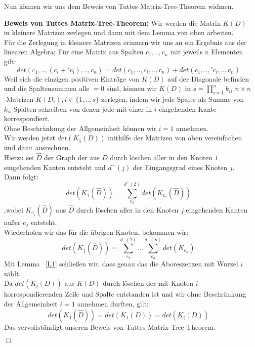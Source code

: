 Nun können wir uns dem Beweis von Tuttes Matrix-Tree-Theorem widmen.

\textbf{Beweis von Tuttes Matrix-Tree-Theorem:}
Wir werden die Matrix $K(D)$ in kleinere Matrizen zerlegen und dann mit dem Lemma von oben arbeiten.\\
Für die Zerlegung in kleinere Matrizen erinnern wir uns an ein Ergebnis aus der linearen Algebra;
Für eine Matrix aus Spalten $c_1,..,c_n$ mit jeweils n Elementen gilt:
\begin{equation}
 det(c_1,..,(c_i+\prime{c_i}),..,c_n) = det(c_1,..,c_i,..,c_n) + det(c_1,..,\prime{c_i},..,c_n)
\end{equation}
Weil sich die einzigen positiven Einträge von $K(D)$ auf der Diagonale befinden und die Spaltensummen alle $=0$ sind, können wir $K(D)$ in  $s=\prod_{i=1}^nk_{ii}$ $n \times n$-Matrizen $K(D_i), i\in\{1,..,s\}$ zerlegen, indem wir jede Spalte als Summe von $k_{ii}$ Spalten schreiben von denen jede mit einer in $i$ eingehenden Kante korrespondiert.\\
Ohne Beschränkung der Allgemeinheit können wir $i=1$ annehmen.\\
Wir werden jetzt $det(K_{\bar{1}}(D))$ mithilfe der Matrizen von oben vereinfachen und dann ausrechnen.\\
Hierzu sei $\hat{D}$ der Graph der aus $D$ durch löschen aller in den Knoten $1$ eingehenden Kanten entsteht und $d^{-}(j)$ der Eingangsgrad eines Knoten $j$. Dann folgt:
\begin{equation}
 det(K_{\bar{1}}(\hat{D})) = \sum_{e_2}^{d^{-}(2)}det(K_{e_2}(\hat{D}))
\end{equation}
,wobei $K_{e_j}(\hat{D})$ aus $\hat{D}$ durch löschen aller in den Knoten $j$ eingehenden Kanten außer $e_j$ entsteht.\\
Wiederholen wir das für die übrigen Knoten, bekommen wir:
\begin{equation}
  det(K_{\bar{1}}(\hat{D})) = \sum_{e_2}^{d^{-}(2)}...\sum_{e_n}^{d^{-}(n)}det(K_{e_n})
\end{equation}
Mit Lemma ~\ref{L1} schließen wir, dass genau das die Aboreszenzen mit Wurzel $i$ zählt.\\
Da $det(K_{\bar{i}}(D))$ aus $K(D)$ durch löschen der mit Knoten $i$ korrespondierenden Zeile und Spalte entstanden ist und wir ohne Beschränkung der Allgemeinheit $i=1$ annehmen durften, gilt:
\begin{equation}
 det(K_{\bar{1}}(\hat{D}))=det(K_{\bar{1}}(D))=det(K_{\bar{i}}(D))
\end{equation}
Das vervollständigt unseren Beweis von Tuttes Matrix-Tree-Theorem.
\begin{flushright} $\Box$ \end{flushright} 

